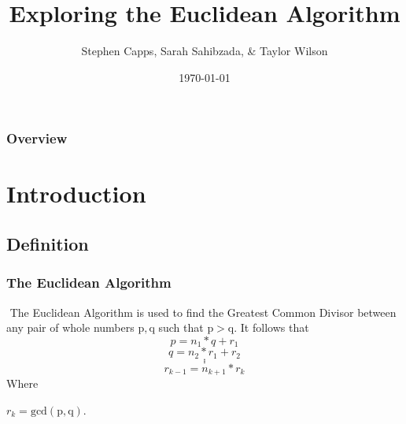 \documentclass{beamer}
\title[Euclidean Algorithm]{Exploring the Euclidean Algorithm} %
\author{Stephen Capps, Sarah Sahibzada, \& Taylor Wilson} %
\institute[TAMU] %
{
Texas A\&{}M University \\ %
\medskip
\textit{Supurvisor: Sara Pollock} %
}
\date{\today} %
\begin{document}
\begin{frame}
\titlepage %
\end{frame}

\begin{frame}
\frametitle{Overview} %
\tableofcontents %
\end{frame}


\section{Introduction}
\subsection{Definition}
\begin{frame}
\frametitle{The Euclidean Algorithm} $ $
\indent The Euclidean Algorithm is used to find the Greatest Common Divisor between any pair of whole numbers $\mathrm{p, q}$ such that $\mathrm{p>q}$.
\indent It follows that 
$$p = n_1*q + r_1$$ 
$$q = n_2*r_1 + r_2$$
$$.$$
$$.$$
$$.$$
$$r_{k-1} = n_{k+1}*r_k$$
Where \begin{center}$r_k = \mathrm{gcd(p,q)}$.\end{center}
\end{frame}
\end{document}
